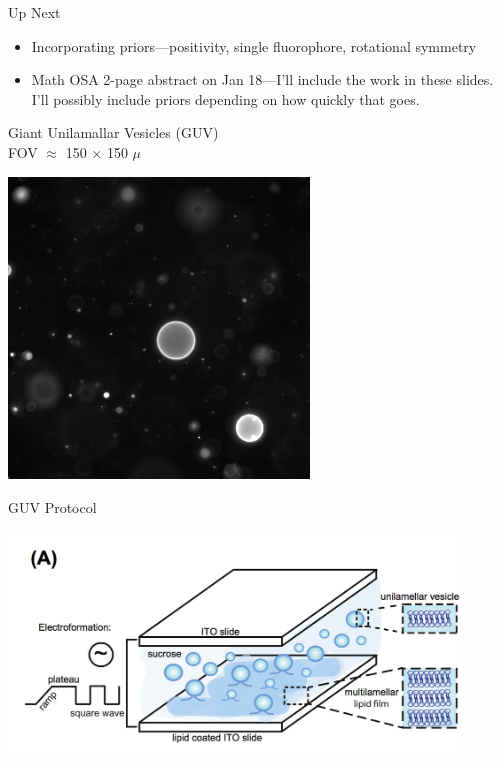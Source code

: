 \documentclass[presentation]{beamer}
\begin{document}
\begin{frame}{Up Next}
  \begin{itemize}
  \item Incorporating priors---positivity, single fluorophore, rotational symmetry
  \item Math OSA 2-page abstract on Jan 18---I'll include the work in these
    slides. I'll possibly include priors depending on how quickly that goes.
  \end{itemize}
\end{frame}

\begin{frame}[label=sec-12]{Giant Unilamallar Vesicles (GUV)\\ FOV $\approx$ 150 $\times$ 150 $\mu$}
\begin{center}
  \includegraphics[width=0.6\textwidth, interpolate=true]{figs/guv.jpg}
\end{center}
\end{frame}
\begin{frame}[label=sec-13]{GUV Protocol}
\begin{center}
  \includegraphics[width=0.9\textwidth, interpolate=true]{figs/schmid2015}
\end{center}
\end{frame}
\end{document}
